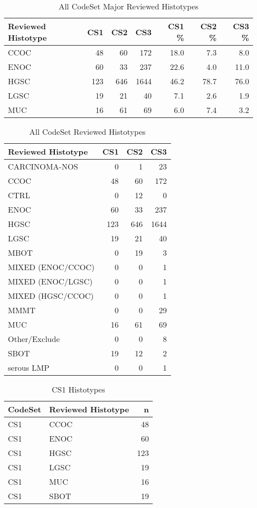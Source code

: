 \documentclass[
]{report}
\begin{document}
\begin{table}

\caption{\label{tab:dist-major-hist}All CodeSet Major Reviewed Histotypes}
\centering
\begin{tabular}[t]{l|r|r|r|r|r|r}
\hline
Reviewed Histotype & CS1 & CS2 & CS3 & CS1 \% & CS2 \% & CS3 \%\\
\hline
CCOC & 48 & 60 & 172 & 18.0 & 7.3 & 8.0\\
\hline
ENOC & 60 & 33 & 237 & 22.6 & 4.0 & 11.0\\
\hline
HGSC & 123 & 646 & 1644 & 46.2 & 78.7 & 76.0\\
\hline
LGSC & 19 & 21 & 40 & 7.1 & 2.6 & 1.9\\
\hline
MUC & 16 & 61 & 69 & 6.0 & 7.4 & 3.2\\
\hline
\end{tabular}
\end{table}

\begin{table}

\caption{\label{tab:dist-all}All CodeSet Reviewed Histotypes}
\centering
\begin{tabular}[t]{l|r|r|r}
\hline
Reviewed Histotype & CS1 & CS2 & CS3\\
\hline
CARCINOMA-NOS & 0 & 1 & 23\\
\hline
CCOC & 48 & 60 & 172\\
\hline
CTRL & 0 & 12 & 0\\
\hline
ENOC & 60 & 33 & 237\\
\hline
HGSC & 123 & 646 & 1644\\
\hline
LGSC & 19 & 21 & 40\\
\hline
MBOT & 0 & 19 & 3\\
\hline
MIXED (ENOC/CCOC) & 0 & 0 & 1\\
\hline
MIXED (ENOC/LGSC) & 0 & 0 & 1\\
\hline
MIXED (HGSC/CCOC) & 0 & 0 & 1\\
\hline
MMMT & 0 & 0 & 29\\
\hline
MUC & 16 & 61 & 69\\
\hline
Other/Exclude & 0 & 0 & 8\\
\hline
SBOT & 19 & 12 & 2\\
\hline
serous LMP & 0 & 0 & 1\\
\hline
\end{tabular}
\end{table}

\begin{table}

\caption{\label{tab:dist-cs1}CS1 Histotypes}
\centering
\begin{tabular}[t]{l|l|r}
\hline
CodeSet & Reviewed Histotype & n\\
\hline
CS1 & CCOC & 48\\
\hline
CS1 & ENOC & 60\\
\hline
CS1 & HGSC & 123\\
\hline
CS1 & LGSC & 19\\
\hline
CS1 & MUC & 16\\
\hline
CS1 & SBOT & 19\\
\hline
\end{tabular}
\end{table}
\end{document}
